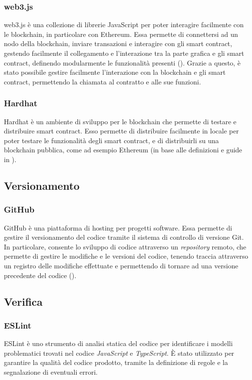 \subsubsection{web3.js}
web3.js è una collezione di librerie JavaScript per poter interagire facilmente con le blockchain, in particolare con Ethereum.
Essa permette di connettersi ad un nodo della blockchain, inviare transazioni e interagire con gli smart contract, gestendo facilmente il collegamento
e l'interazione tra la parte grafica e gli smart contract, definendo modularmente le funzionalità presenti (\cite{site:web3}).
Grazie a questo, è stato possibile gestire facilmente l'interazione con la blockchain e gli smart contract, permettendo la chiamata al contratto
e alle sue funzioni.

\subsubsection{Hardhat}
Hardhat è un ambiente di sviluppo per le blockchain che permette di testare e distribuire smart contract. Esso permette di distribuire facilmente
in locale per poter testare le funzionalità degli smart contract, e di distribuirli su una blockchain pubblica, come ad esempio
Ethereum (in base alle definizioni e guide in \cite{site:hardhat}).

\subsection{Versionamento}

\subsubsection{GitHub}
GitHub è una piattaforma di hosting per progetti software. Essa permette di gestire il versionamento del codice tramite il sistema di controllo di versione Git.
In particolare, consente lo sviluppo di codice attraverso un \textit{repository} remoto, che permette di gestire le modifiche e le versioni del codice, tenendo traccia attraverso un registro
delle modifiche effettuate e permettendo di tornare ad una versione precedente del codice (\cite{site:github}). 

\subsection{Verifica}

\subsubsection{ESLint}
ESLint è uno strumento di analisi statica del codice per identificare i modelli problematici trovati nel codice \textit{JavaScript} e \textit{TypeScript}.
È stato utilizzato per garantire la qualità del codice prodotto, tramite la definizione di regole e la segnalazione di eventuali errori.

